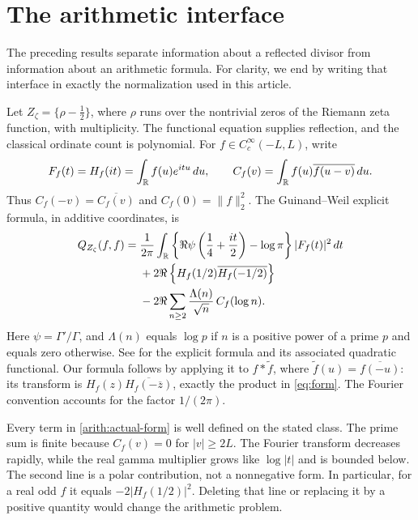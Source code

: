 \section{The arithmetic interface}
\label{sec:arithmetic}

The preceding results separate information about a reflected
divisor from information about an arithmetic formula. For
clarity, we end by writing that interface in exactly the
normalization used in this article.

Let \(Z_\zeta=\{\rho-\tfrac12\}\), where \(\rho\) runs over
the nontrivial zeros of the Riemann zeta function, with
multiplicity. The functional equation supplies reflection,
and the classical ordinate count is polynomial. For
\(f\in C_c^\infty(-L,L)\), write
\[
 F_f(t)=H_f(it)=\int_\mathbb R f(u)e^{itu}\,du,\qquad
 C_f(v)=\int_\mathbb R f(u)\overline{f(u-v)}\,du.
\]
Thus \(C_f(-v)=\overline{C_f(v)}\) and
\(C_f(0)=\|f\|_2^2\). The Guinand--Weil explicit formula,
in additive coordinates, is
\begin{equation}\label{arith:actual-form}
 \begin{split}
 Q_{Z_\zeta}(f,f)
 ={}&\frac1{2\pi}\int_\mathbb R
  \left\{\Re\psi\left(\frac14+\frac{it}2\right)-\log\pi\right\}
                     |F_f(t)|^2\,dt\\
 &+2\Re\left\{H_f(1/2)\overline{H_f(-1/2)}\right\}\\
 &-2\Re\sum_{n\ge2}\frac{\Lambda(n)}{\sqrt n}\,C_f(\log n).
 \end{split}
\end{equation}
Here \(\psi=\Gamma'/\Gamma\), and \(\Lambda(n)\) equals
\(\log p\) if \(n\) is a positive power of a prime \(p\)
and equals zero otherwise. See
\cite[Sections 2--4]{Bombieri} for the explicit formula
and its associated quadratic functional. Our formula follows
by applying it to \(f*\widetilde f\), where
\(\widetilde f(u)=\overline{f(-u)}\): its transform is
\(H_f(z)\overline{H_f(-\overline z)}\), exactly the
product in \eqref{eq:form}. The Fourier convention accounts
for the factor \(1/(2\pi)\).

Every term in \eqref{arith:actual-form} is well defined on
the stated class. The prime sum is finite because
\(C_f(v)=0\) for \(|v|\ge2L\). The Fourier transform decreases
rapidly, while the real gamma multiplier grows like
\(\log|t|\) and is bounded below. The second line is a
polar contribution, not a nonnegative form. In particular,
for a real odd \(f\) it equals \(-2|H_f(1/2)|^2\).
Deleting that line or replacing it by a positive quantity
would change the arithmetic problem.

